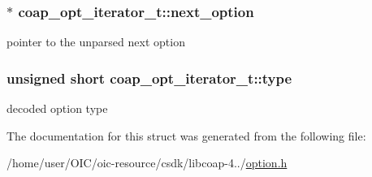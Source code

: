 \subsubsection[{next\+\_\+option}]{$\ast$ coap\+\_\+opt\+\_\+iterator\+\_\+t\+::next\+\_\+option}\label{structcoap__opt__iterator__t_a05da7c127d28e7ba39d7186169596f6a}
pointer to the unparsed next option \hypertarget{structcoap__opt__iterator__t_a57af4275c2fc6b9c2189b917469054f6}{}
\subsubsection[{type}]{\setlength{\rightskip}{0pt plus 5cm}unsigned short coap\+\_\+opt\+\_\+iterator\+\_\+t\+::type}\label{structcoap__opt__iterator__t_a57af4275c2fc6b9c2189b917469054f6}
decoded option type 

The documentation for this struct was generated from the following file\+:\begin{DoxyCompactItemize}
\item 
/home/user/\+O\+I\+C/oic-\/resource/csdk/libcoap-\/4../\hyperlink{option_8h}{option.\+h}\end{DoxyCompactItemize}
